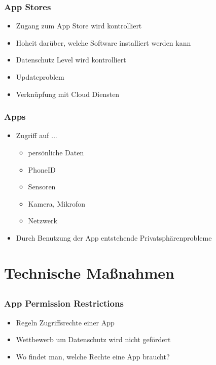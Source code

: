 \documentclass[12pt]{beamer}
\begin{document}
\begin{frame}
	\frametitle{App Stores}
	\begin{itemize}
		\item<2-> Zugang zum App Store wird kontrolliert
		\item<3-> Hoheit darüber, welche Software installiert werden kann
		\item<4-> Datenschutz Level wird kontrolliert
		\item<5-> Updateproblem
		\item<6-> Verknüpfung mit Cloud Diensten
	\end{itemize}
\end{frame}

\begin{frame}
	\frametitle{Apps}
	\begin{itemize}
		\item<2-> Zugriff auf ...
		\begin{itemize}
			\item<3-> persönliche Daten
			\item<4-> PhoneID
			\item<5-> Sensoren
			\item<6-> Kamera, Mikrofon
			\item<7-> Netzwerk
		\end{itemize}
		\item<8-> Durch Benutzung der App entstehende Privatsphärenprobleme
	\end{itemize}
\end{frame}

\section{Technische Maßnahmen}
\subsection{}

\begin{frame}
	\frametitle{App Permission Restrictions}
	\begin{itemize}
		\item<2-> Regeln Zugriffsrechte einer App
		\item<3-> Wettbewerb um Datenschutz wird nicht gefördert
		\item<4-> Wo findet man, welche Rechte eine App braucht?
	\end{itemize}
\end{frame}
\end{document}
